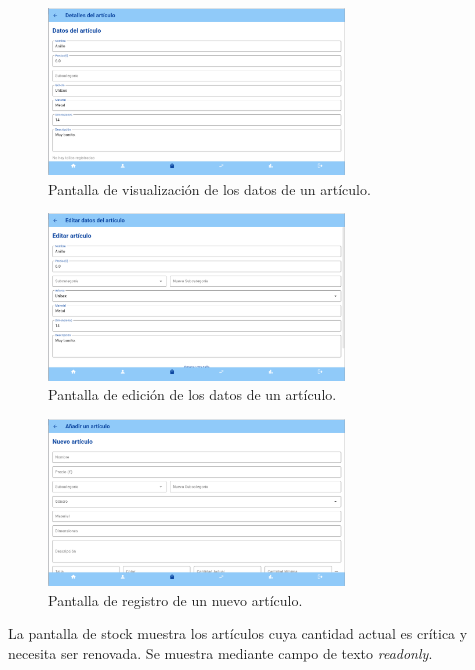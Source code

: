 \begin{figure}[H]
	\centering
	\includegraphics[width=0.7\textwidth]{imagenes/TerceraIteracion/articleDetails.png}
	\caption{Pantalla de visualización de los datos de un artículo.}
\end{figure}

\begin{figure}[H]
	\centering
	\includegraphics[width=0.7\textwidth]{imagenes/TerceraIteracion/articleEdit.png}
	\caption{Pantalla de edición de los datos de un artículo.}
\end{figure}

\begin{figure}[H]
	\centering
	\includegraphics[width=0.7\textwidth]{imagenes/TerceraIteracion/newArticle.png}
	\caption{Pantalla de registro de un nuevo artículo.}
\end{figure}

\newpage

La pantalla de stock muestra los artículos cuya cantidad actual es crítica y necesita ser renovada. Se muestra mediante campo de texto \textit{readonly}.

